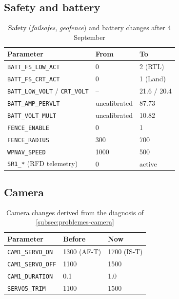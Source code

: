 \subsection{Safety and battery}

\begin{table}[H]
    \centering
    \caption{Safety (\emph{failsafes}, \emph{geofence}) and battery changes after 4 September}
    \label{tab:canvis-seguretat}
    \begin{tabular}{lll}
        \toprule
        Parameter & From & To \\
        \midrule
        \texttt{BATT\_FS\_LOW\_ACT} & 0 & 2 (RTL) \\
        \texttt{BATT\_FS\_CRT\_ACT} & 0 & 1 (Land) \\
        \texttt{BATT\_LOW\_VOLT} / \texttt{CRT\_VOLT} & -- & 21.6 / 20.4 \\
        \texttt{BATT\_AMP\_PERVLT} & uncalibrated & 87.73 \\
        \texttt{BATT\_VOLT\_MULT} & uncalibrated & 10.82 \\
        \texttt{FENCE\_ENABLE} & 0 & 1 \\
        \texttt{FENCE\_RADIUS} & 300 & 700 \\
        \texttt{WPNAV\_SPEED} & 1000 & 500 \\
        \texttt{SR1\_*} (RFD telemetry) & 0 & active \\
        \bottomrule
    \end{tabular}
\end{table}

\subsection{Camera}
\label{subsec:canvis-camera-pendents}

\begin{table}[H]
    \centering
    \caption{Camera changes derived from the diagnosis of \cref{subsec:problemes-camera}}
    \label{tab:canvis-camera}
    \begin{tabular}{lll}
        \toprule
        Parameter & Before & Now \\
        \midrule
        \texttt{CAM1\_SERVO\_ON} & 1300 (AF-T) & 1700 (IS-T) \\
        \texttt{CAM1\_SERVO\_OFF} & 1100 & 1500 \\
        \texttt{CAM1\_DURATION} & 0.1 & 1.0 \\
        \texttt{SERVO5\_TRIM} & 1100 & 1500 \\
        \bottomrule
    \end{tabular}
\end{table}

